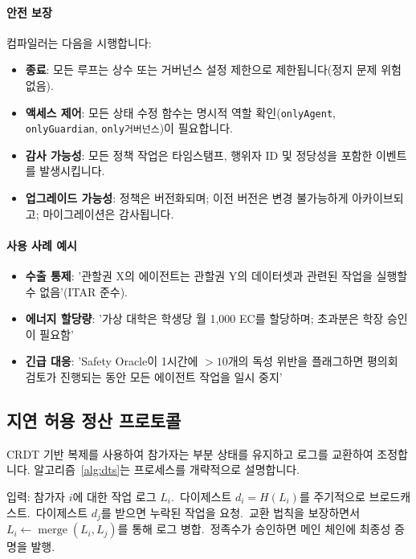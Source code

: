 \documentclass[11pt]{article}
\begin{document}
\paragraph{안전 보장} 컴파일러는 다음을 시행합니다:
\begin{itemize}[noitemsep]
  \item \textbf{종료}: 모든 루프는 상수 또는 거버넌스 설정 제한으로 제한됩니다(정지 문제 위험 없음).
  \item \textbf{액세스 제어}: 모든 상태 수정 함수는 명시적 역할 확인(\texttt{onlyAgent}, \texttt{onlyGuardian}, \texttt{only거버넌스})이 필요합니다.
  \item \textbf{감사 가능성}: 모든 정책 작업은 타임스탬프, 행위자 ID 및 정당성을 포함한 이벤트를 발생시킵니다.
  \item \textbf{업그레이드 가능성}: 정책은 버전화되며; 이전 버전은 변경 불가능하게 아카이브되고; 마이그레이션은 감사됩니다.
\end{itemize}

\paragraph{사용 사례 예시}
\begin{itemize}[noitemsep]
  \item \textbf{수출 통제}: '관할권 X의 에이전트는 관할권 Y의 데이터셋과 관련된 작업을 실행할 수 없음'(ITAR 준수).
  \item \textbf{에너지 할당량}: '가상 대학은 학생당 월 1,000 EC를 할당하며; 초과분은 학장 승인이 필요함'
  \item \textbf{긴급 대응}: 'Safety Oracle이 1시간에 $>10$개의 독성 위반을 플래그하면 평의회 검토가 진행되는 동안 모든 에이전트 작업을 일시 중지'
\end{itemize}

\subsection{지연 허용 정산 프로토콜}
CRDT 기반 복제를 사용하여 참가자는 부분 상태를 유지하고 로그를 교환하여 조정합니다. 알고리즘~\ref{alg:dts}는 프로세스를 개략적으로 설명합니다.

\begin{algorithm}[H]
  \caption{지연 허용 정산 (DTS)}
  \label{alg:dts}
  \begin{algorithmic}[1]
    \STATE 입력: 참가자 $i$에 대한 작업 로그 $L_i$.\
    \STATE 다이제스트 $d_i = H(L_i)$를 주기적으로 브로드캐스트.\
    \STATE 다이제스트 $d_j$를 받으면 누락된 작업을 요청.\
    \STATE 교환 법칙을 보장하면서 $L_i \leftarrow \operatorname{merge}(L_i, L_j)$를 통해 로그 병합.\
    \STATE 정족수가 승인하면 메인 체인에 최종성 증명을 발행.\
  \end{algorithmic}
\end{algorithm}
\end{document}
